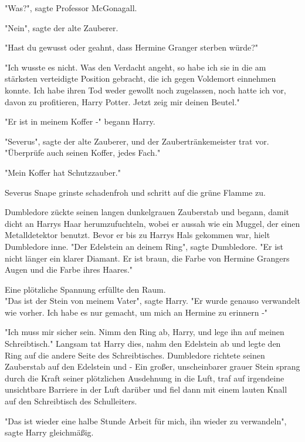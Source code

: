 {"Was?", sagte Professor McGonagall.

"Nein", sagte der alte Zauberer.

"Hast du gewusst oder geahnt, dass Hermine Granger sterben würde?"

"Ich wusste es nicht. Was den Verdacht angeht, so habe ich sie in die am stärksten verteidigte Position gebracht, die ich gegen Voldemort einnehmen konnte. Ich habe ihren Tod weder gewollt noch zugelassen, noch hatte ich vor, davon zu profitieren, Harry Potter. Jetzt zeig mir deinen Beutel."

"Er ist in meinem Koffer -" begann Harry.

"Severus", sagte der alte Zauberer, und der Zaubertränkemeister trat vor. "Überprüfe auch seinen Koffer, jedes Fach."

"Mein Koffer hat Schutzzauber."

Severus Snape grinste schadenfroh und schritt auf die grüne Flamme zu.

Dumbledore zückte seinen langen dunkelgrauen Zauberstab und begann, damit dicht an Harrys Haar herumzufuchteln, wobei er aussah wie ein Muggel, der einen Metalldetektor benutzt. Bevor er bis zu Harrys Hals gekommen war, hielt Dumbledore inne. "Der Edelstein an deinem Ring", sagte Dumbledore. "Er ist nicht länger ein klarer Diamant. Er ist braun, die Farbe von Hermine Grangers Augen und die Farbe ihres Haares."

Eine plötzliche Spannung erfüllte den Raum.\\ "Das ist der Stein von meinem Vater", sagte Harry. "Er wurde genauso verwandelt wie vorher. Ich habe es nur gemacht, um mich an Hermine zu erinnern -"

"Ich muss mir sicher sein. Nimm den Ring ab, Harry, und lege ihn auf meinen Schreibtisch." Langsam tat Harry dies, nahm den Edelstein ab und legte den Ring auf die andere Seite des Schreibtisches. Dumbledore richtete seinen Zauberstab auf den Edelstein und - Ein großer, unscheinbarer grauer Stein sprang durch die Kraft seiner plötzlichen Ausdehnung in die Luft, traf auf irgendeine unsichtbare Barriere in der Luft darüber und fiel dann mit einem lauten Knall auf den Schreibtisch des Schulleiters.

"Das ist wieder eine halbe Stunde Arbeit für mich, ihn wieder zu verwandeln", sagte Harry gleichmäßig.

}
